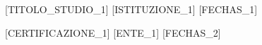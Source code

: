 
\begin{cventries}
  \cventry
    {[TITOLO\_STUDIO\_1]}
    {[ISTITUZIONE\_1]}
    {}
    {[FECHAS\_1]}
    {}

  \cventry
    {[CERTIFICAZIONE\_1]}
    {[ENTE\_1]}
    {}
    {[FECHAS\_2]}
    {}
\end{cventries}
